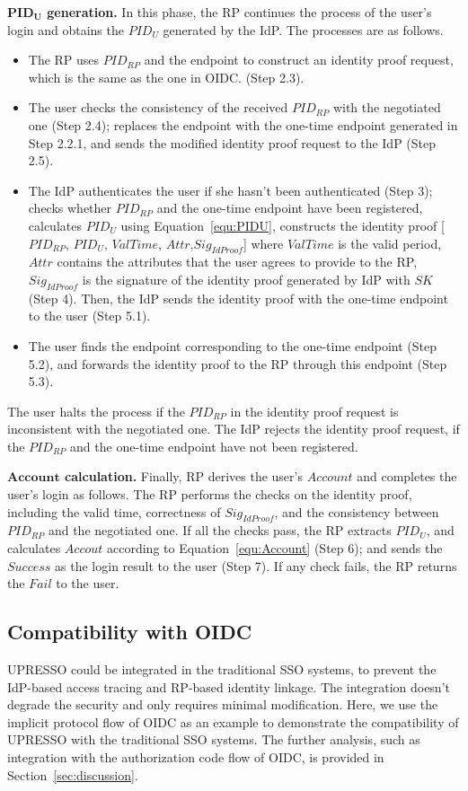 \vspace{1mm}\noindent\textbf{$\mathbf{PID_U}$ generation.}
In this phase, the RP continues the process of the user's login and obtains the $PID_U$ generated by the IdP. The processes are as follows.
\begin{itemize}
  \item The RP uses $PID_{RP}$ and the endpoint to construct an identity proof request, which is the same as the one in  OIDC. (Step 2.3).
  \item The user checks the consistency of the received $PID_{RP}$  with the negotiated one (Step 2.4); replaces the endpoint with the one-time endpoint generated in Step 2.2.1, and sends the modified identity proof request to the IdP (Step 2.5).
  \item The IdP authenticates the user if she hasn't been authenticated (Step 3); checks whether $PID_{RP}$ and the one-time endpoint have been registered,
   calculates $PID_U$ using Equation~\ref{equ:PIDU},  constructs the identity proof [$PID_{RP}$, $PID_U$, $ValTime$, $Attr$,$Sig_{IdProof}$] where $ValTime$ is the valid period, $Attr$ contains the  attributes that the user agrees to provide to the RP, $Sig_{IdProof}$ is the signature of the identity proof generated by IdP with $SK$ (Step 4). Then, the IdP sends the identity proof with the one-time endpoint to the user (Step 5.1).
  \item The user finds  the  endpoint corresponding to the one-time endpoint (Step 5.2),
   and forwards the identity proof to the RP through this endpoint (Step 5.3).
\end{itemize}
The user halts the process if the $PID_{RP}$ in the identity proof request is inconsistent with  the negotiated one.
The IdP rejects the identity proof request, if the $PID_{RP}$ and the one-time endpoint have not been registered.


\vspace{1mm}\noindent\textbf{$\mathbf{Account}$ calculation.}
Finally, RP derives the user's  $Account$ and completes the user's login as follows. The RP performs the checks on the identity proof, including the valid time, correctness of $Sig_{IdProof}$, and   the consistency between $PID_{RP}$ and the  negotiated one. If all the checks pass, the RP extracts $PID_U$, and calculates $Accout$ according to Equation~\ref{equ:Account} (Step 6); and sends the $Success$ as the login result to the user (Step 7). If any check fails, the RP returns the $Fail$ to the user.


\subsection{Compatibility with OIDC}
\label{subsec:compatible}
UPRESSO could be integrated in the traditional SSO systems, to  prevent the IdP-based access tracing and RP-based identity linkage. 
The integration doesn't degrade the security and only requires minimal modification. 
Here, we use the implicit protocol flow of OIDC as an example to demonstrate the compatibility of UPRESSO with the traditional SSO systems.
The further analysis, such as integration with the authorization code flow of OIDC,  is provided in Section~\ref{sec:discussion}.


